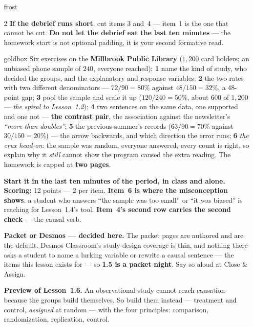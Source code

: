 \documentclass[10pt]{article}
\begin{document}
\begin{skillbox}{frost}
\begin{multicols}{2}
\textbf{If the debrief runs short}, cut items 3 and~4 --- item~1 is the one that cannot be cut.
\textbf{Do not let the debrief eat the last ten minutes} --- the homework start is not optional
padding, it is your second formative read.
\end{multicols}
\end{skillbox}

\boxguard
\begin{skillbox}{goldbox}
Six exercises on the \textbf{Millbrook Public Library} ($1{,}200$ card holders; an unbiased
phone sample of $240$, everyone reached): \textbf{1} name the kind of study, who decided the
groups, and the explanatory and response variables; \textbf{2} the two rates with two different
denominators --- $72/90 = 80\%$ against $48/150 = 32\%$, a $48$-point gap; \textbf{3} pool the
sample and scale it up ($120/240 = 50\%$, about $600$ of $1{,}200$ --- \emph{the spiral to
Lesson~1.2}); \textbf{4} two sentences on the same data, one supported and one not --- \textbf{the
contrast pair}, the association against the newsletter's \emph{``more than doubles''};
\textbf{5} the previous summer's records ($63/90 = 70\%$ against $30/150 = 20\%$) --- the arrow
backwards, and which direction the error runs; \textbf{6} \emph{the crux head-on}: the sample
was random, everyone answered, every count is right, so explain why it \emph{still} cannot show
the program caused the extra reading. The homework is capped at \textbf{two pages}.

\textbf{Start it in the last ten minutes of the period, in class and alone.} \textbf{Scoring:}
12 points --- 2 per item. \textbf{Item~6 is where the misconception shows}: a student who
answers ``the sample was too small'' or ``it was biased'' is reaching for Lesson~1.4's tool.
\textbf{Item~4's second row carries the second check} --- the causal verb.

\textbf{Packet or Desmos --- decided here.} The packet pages are authored and are the default.
Desmos Classroom's study-design coverage is thin, and nothing there asks a student to name a
lurking variable or rewrite a causal sentence --- the items this lesson exists for --- so
\textbf{1.5 is a packet night}. Say so aloud at Close \& Assign.

\textbf{Preview of Lesson~1.6.} An observational study cannot reach causation because the
groups build themselves. So build them instead --- treatment and control, \emph{assigned} at
random --- with the four principles: comparison, randomization, replication, control.


\end{skillbox}
\end{document}
